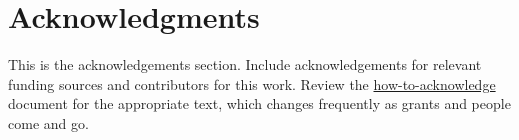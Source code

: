 \section{Acknowledgments}
This is the acknowledgements section.
Include acknowledgements for relevant funding sources and contributors for
this work. Review the \href{https://drive.google.com/open?id=1VybV0oMPiqpInTwgO0ICq0EC4AL_fGj-zbXGJAhRiVU}{how-to-acknowledge}
document for the appropriate text, which changes frequently as grants and people
come and go.
